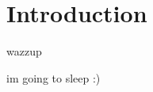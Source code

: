 \documentclass{article}
\begin{document}
\section{Introduction}
wazzup

im going to sleep :)
\end{document}
